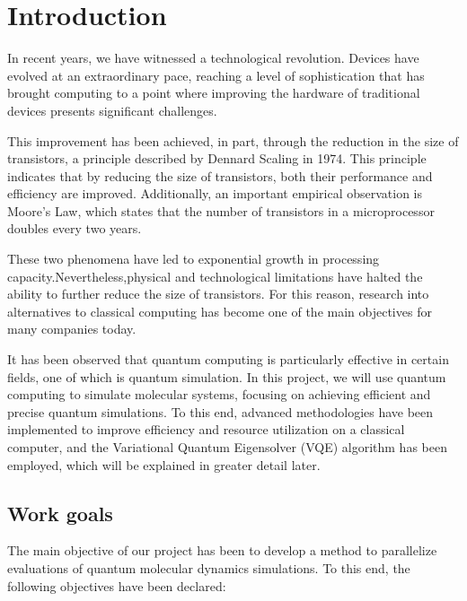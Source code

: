 
\chapter{Introduction}
In recent years, we have witnessed a technological revolution. Devices have evolved at an extraordinary pace, reaching a level of sophistication that has brought computing to a point where improving the hardware of traditional devices presents significant challenges.

This improvement has been achieved, in part, through the reduction in the size of transistors, a principle described by Dennard Scaling in 1974. This principle indicates that by reducing the size of transistors, both their performance and efficiency are improved. Additionally, an important empirical observation is Moore's Law, which states that the number of transistors in a microprocessor doubles every two years.

These two phenomena have led to exponential growth in processing capacity.Nevertheless,physical and technological limitations have halted the ability to further reduce the size of transistors. For this reason, research into alternatives to classical computing has become one of the main objectives for many companies today.

It has been observed that quantum computing is particularly effective in certain fields, one of which is quantum simulation. In this project, we will use quantum computing to simulate molecular systems, focusing on achieving efficient and precise quantum simulations. To this end, advanced methodologies have been implemented to improve efficiency and resource utilization on a classical computer, and the Variational Quantum Eigensolver (VQE) algorithm has been employed, which will be explained in greater detail later.

\section{Work goals}
The main objective of our project has been to develop a method to parallelize evaluations of quantum molecular dynamics simulations. To this end, the following objectives have been declared:

